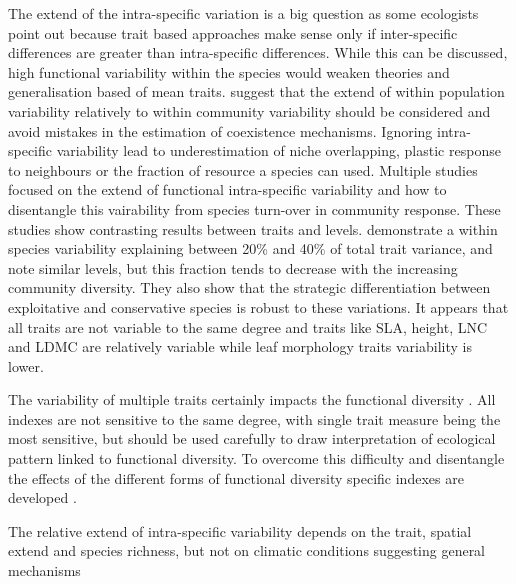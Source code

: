 The extend of the intra-specific variation is a big question as some ecologists point out because trait based approaches make sense only if inter-specific differences are greater than intra-specific differences. While this can be discussed, high functional variability within the species would weaken theories and generalisation based of mean traits. \cite{violle_return_2012} suggest that the extend of within population variability relatively to within community variability should be considered and avoid mistakes in the estimation of coexistence mechanisms. Ignoring intra-specific variability lead to underestimation of niche overlapping, plastic response to neighbours or the fraction of resource a species can used. Multiple studies focused on the extend of functional intra-specific variability \parencite{albert_intraspecific_2010, albert_multi-trait_2010} and how to disentangle this vairability from species turn-over \parencite{leps_community_2011} in community response. These studies show contrasting results between traits and levels. \cite{albert_multi-trait_2010} demonstrate a within species variability explaining between 20\% and 40\% of total trait variance, and \cite{siefert_global_2015} note similar levels, but this fraction tends to decrease with the increasing community diversity. They also show that the strategic differentiation between exploitative and conservative species is robust to these variations. It appears that all traits are not variable to the same degree and traits like SLA, height, LNC and LDMC are relatively variable while leaf morphology traits variability is lower\cite{siefert_global_2015}. 

The variability of multiple traits certainly impacts the functional diversity \parencite{de_bello_quantifying_2011, albert_importance_2012}. All indexes are not sensitive to the same degree, with single trait measure being the most sensitive, but should be used carefully to draw interpretation of ecological pattern linked to functional diversity. To overcome this difficulty and disentangle the effects of the different forms of functional diversity specific indexes are developed \parencite{de_bello_quantifying_2011}.

The relative extend of intra-specific variability depends on the trait, spatial extend and species richness, but not on climatic conditions \parencite{siefert_global_2015} suggesting general mechanisms 
%
%
%

